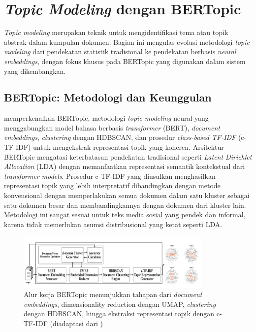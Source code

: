 \section{\textit{Topic Modeling} dengan BERTopic}
\label{sec:topic-modeling}

\textit{Topic modeling} merupakan teknik untuk mengidentifikasi tema atau topik abstrak dalam kumpulan dokumen. Bagian ini mengulas evolusi metodologi \textit{topic modeling} dari pendekatan statistik tradisional ke pendekatan berbasis \textit{neural embeddings}, dengan fokus khusus pada BERTopic yang digunakan dalam sistem yang dikembangkan.

\subsection{BERTopic: Metodologi dan Keunggulan}

\textcite{grootendorst2022} memperkenalkan BERTopic, metodologi \textit{topic modeling} neural yang menggabungkan model bahasa berbasis \textit{transformer} (BERT), \textit{document embeddings}, \textit{clustering} dengan HDBSCAN, dan prosedur \textit{class-based TF-IDF} (c-TF-IDF) untuk mengekstrak representasi topik yang koheren. Arsitektur BERTopic mengatasi keterbatasan pendekatan tradisional seperti \textit{Latent Dirichlet Allocation} (LDA) dengan memanfaatkan representasi semantik kontekstual dari \textit{transformer models}. Prosedur c-TF-IDF yang diusulkan menghasilkan representasi topik yang lebih interpretatif dibandingkan dengan metode konvensional dengan memperlakukan semua dokumen dalam satu kluster sebagai satu dokumen besar dan membandingkannya dengan dokumen dari kluster lain. Metodologi ini sangat sesuai untuk teks media sosial yang pendek dan informal, karena tidak memerlukan asumsi distribusional yang ketat seperti LDA.

\begin{figure}[H]
  \centering
  \includegraphics[width=0.85\textwidth]{image/bertopic-workflow.png}
  \caption{Alur kerja BERTopic menunjukkan tahapan dari \textit{document embeddings}, dimensionality reduction dengan UMAP, \textit{clustering} dengan HDBSCAN, hingga ekstraksi representasi topik dengan c-TF-IDF (diadaptasi dari \textcite{grootendorst2022})}
  \label{fig:bertopic-workflow}
\end{figure}

